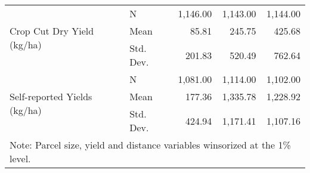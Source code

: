 \begin{table}
\begin{tabular}{llrrr}
\multirow[c]{3}{*}{Crop Cut Dry Yield (kg/ha)} & N & 1,146.00 & 1,143.00 & 1,144.00 \\
 & Mean & 85.81 & 245.75 & 425.68 \\
 & Std. Dev. & 201.83 & 520.49 & 762.64 \\
\multirow[c]{3}{*}{Self-reported Yields (kg/ha)} & N & 1,081.00 & 1,114.00 & 1,102.00 \\
 & Mean & 177.36 & 1,335.78 & 1,228.92 \\
 & Std. Dev. & 424.94 & 1,171.41 & 1,107.16 \\
\bottomrule
\multicolumn{6}{l}{Note: Parcel size, yield and distance variables winsorized at the 1\% level.}
\end{tabular}
\end{table}
